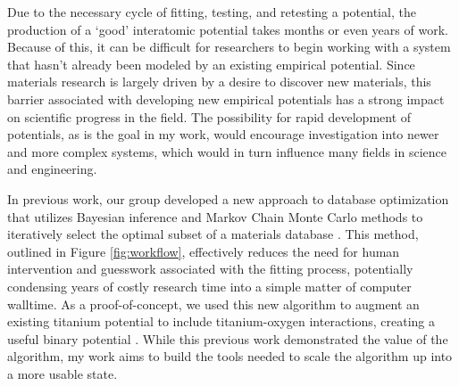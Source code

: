 \documentclass[11pt]{article}
\begin{document}
Due to the necessary cycle of fitting, testing, and retesting a potential, the production of a `good' interatomic potential takes months or even years of work. Because of this, it can be difficult for researchers to begin working with a system that hasn't already been modeled by an existing empirical potential. Since materials research is largely driven by a desire to discover new materials, this barrier associated with developing new empirical potentials has a strong impact on scientific progress in the field. The possibility for rapid development of potentials, as is the goal in my work, would encourage investigation into newer and more complex systems, which would in turn influence many fields in science and engineering.


In previous work, our group developed a new approach to database optimization that utilizes Bayesian inference \cite{baye} and Markov Chain Monte Carlo methods to iteratively select the optimal subset of a materials database \cite{dbopt}. This method, outlined in Figure \ref{fig:workflow}, effectively reduces the need for human intervention and guesswork associated with the fitting process, potentially condensing years of costly research time into a simple matter of computer walltime. As a proof-of-concept, we used this new algorithm to augment an existing titanium potential to include titanium-oxygen interactions, creating a useful binary potential \cite{tio}. While this previous work demonstrated the value of the algorithm, my work aims to build the tools needed to scale the algorithm up into a more usable state.
\end{document}
